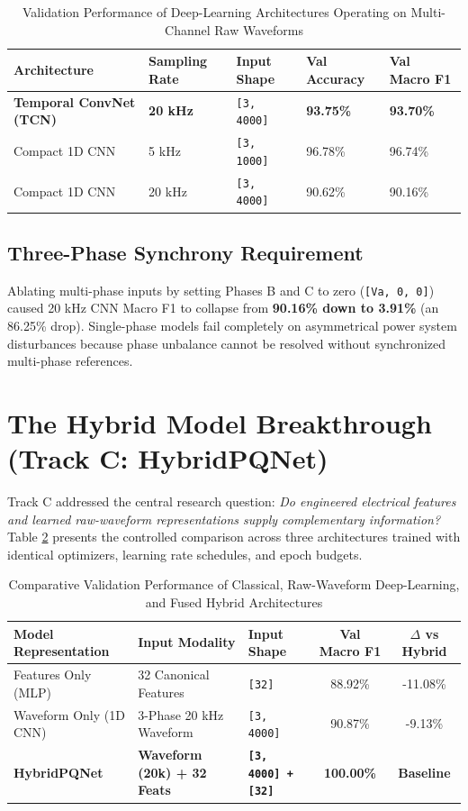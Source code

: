 \documentclass[12pt,a4paper]{report}
\begin{document}
\begin{table}[H]
\centering
\caption{Validation Performance of Deep-Learning Architectures Operating on Multi-Channel Raw Waveforms}
\label{tab:dl_results}
\begin{tabularx}{\textwidth}{lXXXX}
\toprule
\textbf{Architecture} & \textbf{Sampling Rate} & \textbf{Input Shape} & \textbf{Val Accuracy} & \textbf{Val Macro F1} \\
\midrule
\textbf{Temporal ConvNet (TCN)} & \textbf{20 kHz} & \texttt{[3, 4000]} & \textbf{93.75\%} & \textbf{93.70\%} \\
Compact 1D CNN & 5 kHz & \texttt{[3, 1000]} & 96.78\% & 96.74\% \\
Compact 1D CNN & 20 kHz & \texttt{[3, 4000]} & 90.62\% & 90.16\% \\
\bottomrule
\end{tabularx}
\end{table}

\subsection{Three-Phase Synchrony Requirement}
Ablating multi-phase inputs by setting Phases B and C to zero (\texttt{[Va, 0, 0]}) caused 20 kHz CNN Macro F1 to collapse from \textbf{90.16\% down to 3.91\%} (an 86.25\% drop). Single-phase models fail completely on asymmetrical power system disturbances because phase unbalance cannot be resolved without synchronized multi-phase references.

\section{The Hybrid Model Breakthrough (Track C: HybridPQNet)}
\label{sec:hybrid_breakthrough}
Track C addressed the central research question: \textit{Do engineered electrical features and learned raw-waveform representations supply complementary information?}
Table \ref{tab:hybrid_results} presents the controlled comparison across three architectures trained with identical optimizers, learning rate schedules, and epoch budgets.

\begin{table}[H]
\centering
\caption{Comparative Validation Performance of Classical, Raw-Waveform Deep-Learning, and Fused Hybrid Architectures}
\label{tab:hybrid_results}
\small
\begin{tabularx}{\textwidth}{p{4.2cm}p{3.8cm}p{2.8cm}cc}
\toprule
\textbf{Model Representation} & \textbf{Input Modality} & \textbf{Input Shape} & \textbf{Val Macro F1} & \textbf{$\Delta$ vs Hybrid} \\
\midrule
Features Only (MLP) & 32 Canonical Features & \texttt{[32]} & 88.92\% & -11.08\% \\
Waveform Only (1D CNN) & 3-Phase 20 kHz Waveform & \texttt{[3, 4000]} & 90.87\% & -9.13\% \\
\textbf{HybridPQNet} & \textbf{Waveform (20k) + 32 Feats} & \textbf{\texttt{[3, 4000] + [32]}} & \textbf{100.00\%} & \textbf{Baseline} \\
\bottomrule
\end{tabularx}
\end{table}
\end{document}
